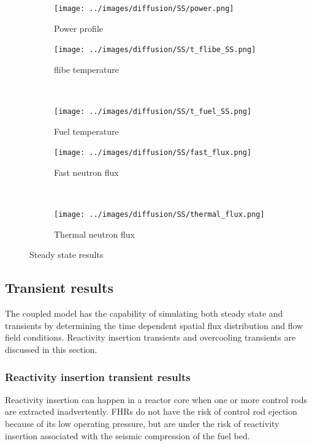 \documentclass{elsarticle}
\begin{document}
\begin{figure}[ht]
  \centering
    \begin{subfigure}[b]{0.5\textwidth}
        \centering
        \texttt{[image: ../images/diffusion/SS/power.png]}
        \caption{Power profile}
    \end{subfigure}%

    \begin{subfigure}[b]{0.45\textwidth}
        \centering
        \texttt{[image: ../images/diffusion/SS/t\_flibe\_SS.png]}
        \caption{flibe temperature}
    \end{subfigure}%
    ~
    \begin{subfigure}[b]{0.45\textwidth}
        \centering
        \texttt{[image: ../images/diffusion/SS/t\_fuel\_SS.png]}
        \caption{Fuel temperature}
    \end{subfigure}

    \begin{subfigure}[b]{0.45\textwidth}
        \centering
        \texttt{[image: ../images/diffusion/SS/fast\_flux.png]}
        \caption{Fast neutron flux}
    \end{subfigure}%
    ~
    \begin{subfigure}[b]{0.45\textwidth}
        \centering
        \texttt{[image: ../images/diffusion/SS/thermal\_flux.png]}
        \caption{Thermal neutron flux}
    \end{subfigure}
  \caption{Steady state results}
  \label{fig:ss_res}
\end{figure}

\subsection{Transient results}
The coupled model has the capability of simulating both steady state and transients by determining the time dependent spatial flux distribution and flow field conditions. Reactivity insertion transients and overcooling transients are discussed in this section.





\subsubsection{Reactivity insertion transient results}
Reactivity insertion can happen in a reactor core when one or more control rods are extracted inadvertently. FHRs do not have the risk of control rod ejection because of its low operating pressure, but are under the risk of reactivity insertion associated with the seismic compression of the fuel bed.
\end{document}
